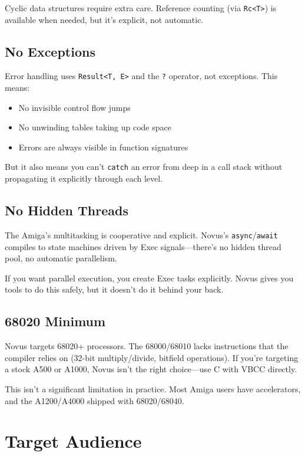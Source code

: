 Cyclic data structures require extra care. Reference counting (via \texttt{Rc<T>}) is available when needed, but it's explicit, not automatic.

\subsection{No Exceptions}

Error handling uses \texttt{Result<T, E>} and the \texttt{?} operator, not exceptions. This means:

\begin{itemize}
    \item No invisible control flow jumps
    \item No unwinding tables taking up code space
    \item Errors are always visible in function signatures
\end{itemize}

But it also means you can't \texttt{catch} an error from deep in a call stack without propagating it explicitly through each level.

\subsection{No Hidden Threads}

The Amiga's multitasking is cooperative and explicit. Novus's \texttt{async}/\texttt{await} compiles to state machines driven by Exec signals---there's no hidden thread pool, no automatic parallelism.

If you want parallel execution, you create Exec tasks explicitly. Novus gives you tools to do this safely, but it doesn't do it behind your back.

\subsection{68020 Minimum}

Novus targets 68020+ processors. The 68000/68010 lacks instructions that the compiler relies on (32-bit multiply/divide, bitfield operations). If you're targeting a stock A500 or A1000, Novus isn't the right choice---use C with VBCC directly.

This isn't a significant limitation in practice. Most Amiga users have accelerators, and the A1200/A4000 shipped with 68020/68040.

\section{Target Audience}


